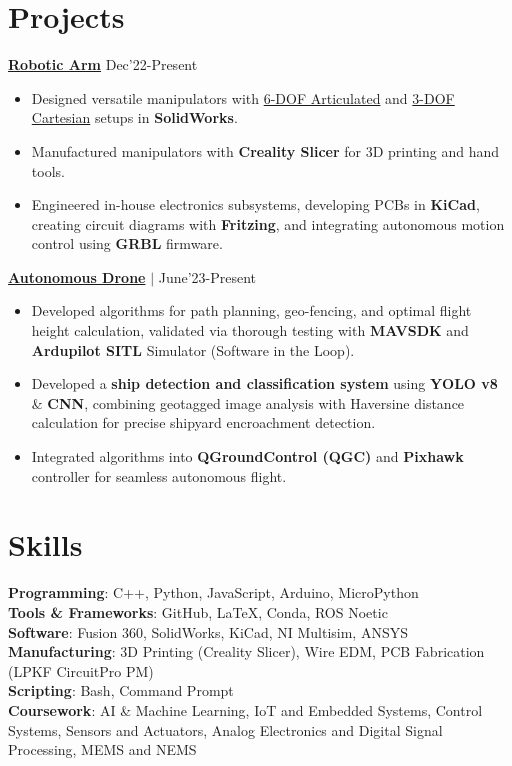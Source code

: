 \documentclass[letterpaper,11pt]{article}
\begin{document}
\section{Projects}

\textbf{{\color{MidnightBlue} \underline{Robotic Arm}}} \hfill Dec'22-Present
\begin{itemize}[leftmargin=*,noitemsep,topsep=-2pt]
  \item Designed versatile manipulators with \href{https://github.com/TeamRED-iiitbh/6-Axis-RoboArm}{6-DOF Articulated} and \href{https://github.com/TeamRED-iiitbh/Cartesian-Manipulator}{3-DOF Cartesian} setups in \textbf{SolidWorks}.
  \item Manufactured manipulators with \textbf{Creality Slicer} for 3D printing and hand tools.
  \item Engineered in-house electronics subsystems, developing PCBs in \textbf{KiCad}, creating circuit diagrams with \textbf{Fritzing}, and integrating autonomous motion control using \textbf{GRBL} firmware.
\end{itemize}

\vspace{4pt}

\textbf{{\color{MidnightBlue} \underline{Autonomous Drone}}} $|$ \emph{\color{MidnightBlue} \href{https://github.com/TeamRED-iiitbh/Autonomous-Drone}{\faGithub{}}} \hfill June'23-Present
\begin{itemize}[leftmargin=*,noitemsep,topsep=-2pt]
  \item Developed algorithms for path planning, geo-fencing, and optimal flight height calculation, validated via thorough testing with \textbf{MAVSDK} and \textbf{Ardupilot SITL} Simulator (Software in the Loop).
  \item Developed a \textbf{ship detection and classification system} using \textbf{YOLO v8} \& \textbf{CNN}, combining geotagged image analysis with Haversine distance calculation for precise shipyard encroachment detection.
  \item Integrated algorithms into \textbf{QGroundControl (QGC)} and \textbf{Pixhawk} controller for seamless autonomous flight.
\end{itemize}

\section{Skills}
\textbf{Programming}: C++, Python, JavaScript, Arduino, MicroPython \\
\textbf{Tools \& Frameworks}: GitHub, \LaTeX, Conda, ROS Noetic \\
\textbf{Software}: Fusion 360, SolidWorks, KiCad, NI Multisim, ANSYS\\
\textbf{Manufacturing}: 3D Printing (Creality Slicer), Wire EDM, PCB Fabrication (LPKF CircuitPro PM) \\
\textbf{Scripting}: Bash, Command Prompt \\
\textbf{Coursework}: AI \& Machine Learning, IoT and Embedded Systems, Control Systems, Sensors and Actuators, Analog Electronics and Digital Signal Processing, MEMS and NEMS
\end{document}
